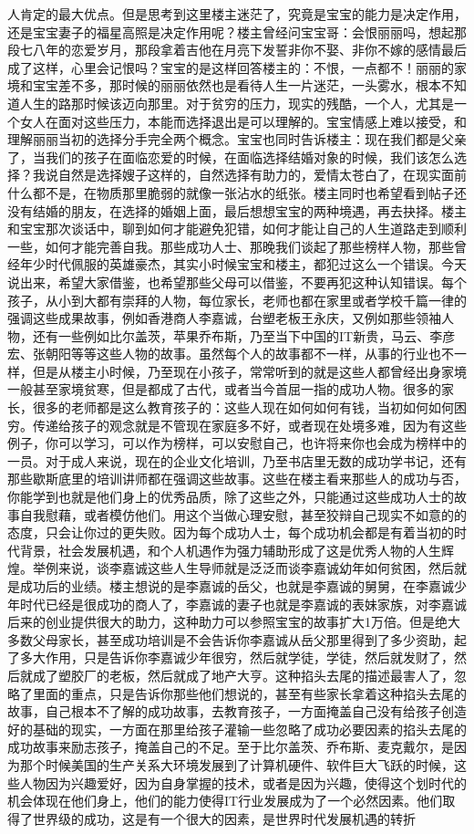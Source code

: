 人肯定的最大优点。但是思考到这里楼主迷茫了，究竟是宝宝的能力是决定作用，还是宝宝妻子的福星高照是决定作用呢？楼主曾经问宝宝哥：会恨丽丽吗，想起那段七八年的恋爱岁月，那段拿着吉他在月亮下发誓非你不娶、非你不嫁的感情最后成了这样，心里会记恨吗？宝宝的是这样回答楼主的：不恨，一点都不！丽丽的家境和宝宝差不多，那时候的丽丽依然也是看待人生一片迷茫，一头雾水，根本不知道人生的路那时候该迈向那里。对于贫穷的压力，现实的残酷，一个人，尤其是一个女人在面对这些压力，本能而选择退出是可以理解的。宝宝情感上难以接受，和理解丽丽当初的选择分手完全两个概念。宝宝也同时告诉楼主：现在我们都是父亲了，当我们的孩子在面临恋爱的时候，在面临选择结婚对象的时候，我们该怎么选择？我说自然是选择嫂子这样的，自然选择有助力的，爱情太苍白了，在现实面前什么都不是，在物质那里脆弱的就像一张沾水的纸张。楼主同时也希望看到帖子还没有结婚的朋友，在选择的婚姻上面，最后想想宝宝的两种境遇，再去抉择。楼主和宝宝那次谈话中，聊到如何才能避免犯错，如何才能让自己的人生道路走到顺利一些，如何才能完善自我。那些成功人士、那晚我们谈起了那些榜样人物，那些曾经年少时代佩服的英雄豪杰，其实小时候宝宝和楼主，都犯过这么一个错误。今天说出来，希望大家借鉴，也希望那些父母可以借鉴，不要再犯这种认知错误。每个孩子，从小到大都有崇拜的人物，每位家长，老师也都在家里或者学校千篇一律的强调这些成果故事，例如香港商人李嘉诚，台塑老板王永庆，又例如那些领袖人物，还有一些例如比尔盖茨，苹果乔布斯，乃至当下中国的IT新贵，马云、李彦宏、张朝阳等等这些人物的故事。虽然每个人的故事都不一样，从事的行业也不一样，但是从楼主小时候，乃至现在小孩子，常常听到的就是这些人都曾经出身家境一般甚至家境贫寒，但是都成了古代，或者当今首屈一指的成功人物。很多的家长，很多的老师都是这么教育孩子的：这些人现在如何如何有钱，当初如何如何困穷。传递给孩子的观念就是不管现在家庭多不好，或者现在处境多难，因为有这些例子，你可以学习，可以作为榜样，可以安慰自己，也许将来你也会成为榜样中的一员。对于成人来说，现在的企业文化培训，乃至书店里无数的成功学书记，还有那些歇斯底里的培训讲师都在强调这些故事。这些在楼主看来那些人的成功与否，你能学到也就是他们身上的优秀品质，除了这些之外，只能通过这些成功人士的故事自我慰藉，或者模仿他们。用这个当做心理安慰，甚至狡辩自己现实不如意的的态度，只会让你过的更失败。因为每个成功人士，每个成功机会都是有着当初的时代背景，社会发展机遇，和个人机遇作为强力辅助形成了这是优秀人物的人生辉煌。举例来说，谈李嘉诚这些人生导师就是泛泛而谈李嘉诚幼年如何贫困，然后就是成功后的业绩。楼主想说的是李嘉诚的岳父，也就是李嘉诚的舅舅，在李嘉诚少年时代已经是很成功的商人了，李嘉诚的妻子也就是李嘉诚的表妹家族，对李嘉诚后来的创业提供很大的助力，这种助力可以参照宝宝的故事扩大1万倍。但是绝大多数父母家长，甚至成功培训是不会告诉你李嘉诚从岳父那里得到了多少资助，起了多大作用，只是告诉你李嘉诚少年很穷，然后就学徒，学徒，然后就发财了，然后就成了塑胶厂的老板，然后就成了地产大亨。这种掐头去尾的描述最害人了，忽略了里面的重点，只是告诉你那些他们想说的，甚至有些家长拿着这种掐头去尾的故事，自己根本不了解的成功故事，去教育孩子，一方面掩盖自己没有给孩子创造好的基础的现实，一方面在那里给孩子灌输一些忽略了成功必要因素的掐头去尾的成功故事来励志孩子，掩盖自己的不足。至于比尔盖茨、乔布斯、麦克戴尔，是因为那个时候美国的生产关系大环境发展到了计算机硬件、软件巨大飞跃的时候，这些人物因为兴趣爱好，因为自身掌握的技术，或者是因为兴趣，使得这个划时代的机会体现在他们身上，他们的能力使得IT行业发展成为了一个必然因素。他们取得了世界级的成功，这是有一个很大的因素，是世界时代发展机遇的转折